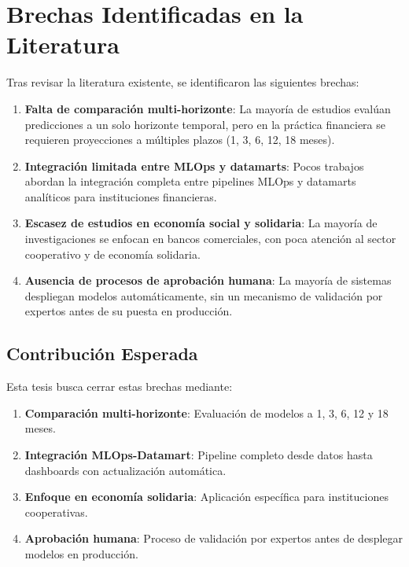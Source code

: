 \section{Brechas Identificadas en la Literatura}

Tras revisar la literatura existente, se identificaron las siguientes
brechas:

\begin{enumerate}
\def\labelenumi{\arabic{enumi}.}
\item
  \textbf{Falta de comparación multi-horizonte}: La mayoría de estudios
  evalúan predicciones a un solo horizonte temporal, pero en la práctica
  financiera se requieren proyecciones a múltiples plazos (1, 3, 6, 12,
  18 meses).
\item
  \textbf{Integración limitada entre MLOps y datamarts}: Pocos trabajos
  abordan la integración completa entre pipelines MLOps y datamarts
  analíticos para instituciones financieras.
\item
  \textbf{Escasez de estudios en economía social y solidaria}: La
  mayoría de investigaciones se enfocan en bancos comerciales, con poca
  atención al sector cooperativo y de economía solidaria.
\item
  \textbf{Ausencia de procesos de aprobación humana}: La mayoría de
  sistemas despliegan modelos automáticamente, sin un mecanismo de
  validación por expertos antes de su puesta en producción.
\end{enumerate}

\subsection{Contribución Esperada}

Esta tesis busca cerrar estas brechas mediante:

\begin{enumerate}
    \item\textbf{Comparación multi-horizonte}: Evaluación de modelos a 1, 3, 6, 12 y 18 meses.
    \item\textbf{Integración MLOps-Datamart}: Pipeline completo desde datos hasta dashboards con actualización automática.
    \item\textbf{Enfoque en economía solidaria}: Aplicación específica para instituciones cooperativas.
    \item\textbf{Aprobación humana}: Proceso de validación por expertos antes de desplegar modelos en producción.
\end{enumerate}